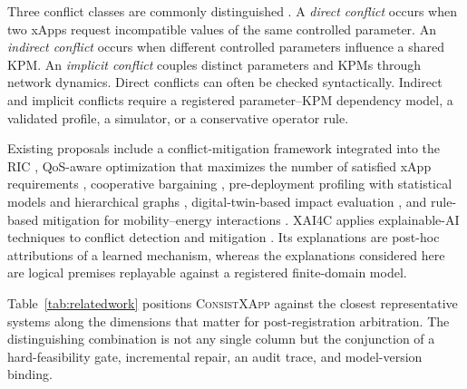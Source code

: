 \documentclass[pdflatex,sn-mathphys-num,iicol,oneside]{sn-jnl}
\newcommand{\method}{\textsc{ConsistXApp}\xspace}
\begin{document}
Three conflict classes are commonly distinguished
\cite{adamczyk2023conflict}. A \emph{direct conflict} occurs when two
xApps request incompatible values of the same controlled parameter.
An \emph{indirect conflict} occurs when different controlled
parameters influence a shared KPM. An \emph{implicit conflict}
couples distinct parameters and KPMs through network dynamics. Direct
conflicts can often be checked syntactically. Indirect and implicit
conflicts require a registered parameter--KPM dependency model, a
validated profile, a simulator, or a conservative operator rule.

Existing proposals include a conflict-mitigation framework integrated
into the RIC \cite{adamczyk2023conflict}, QoS-aware optimization that
maximizes the number of satisfied xApp requirements
\cite{wadud2024qacm,annals2024}, cooperative bargaining
\cite{wadud2023game}, pre-deployment profiling with statistical models
and hierarchical graphs \cite{prever2025pacifista},
digital-twin-based impact evaluation \cite{giannopoulos2025comix}, and
rule-based mitigation for mobility--energy interactions
\cite{wadud2025mobility}. XAI4C applies explainable-AI techniques to
conflict detection and mitigation \cite{varshney2025xai4c}. Its
explanations are post-hoc attributions of a learned mechanism,
whereas the explanations considered here are logical premises
replayable against a registered finite-domain model.

Table~\ref{tab:relatedwork} positions \method against the closest
representative systems along the dimensions that matter for
post-registration arbitration. The distinguishing combination is not
any single column but the conjunction of a hard-feasibility gate,
incremental repair, an audit trace, and model-version binding.
\end{document}
